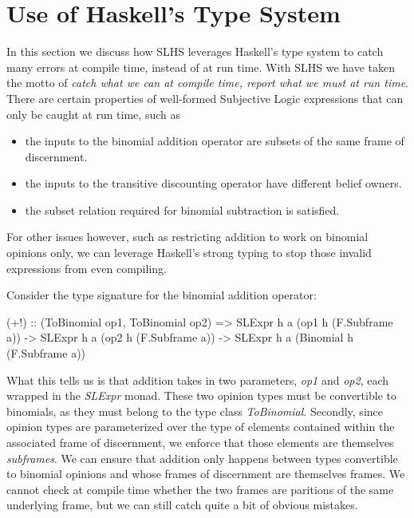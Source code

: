 \documentclass[thesis.tex]{subfiles}
\begin{document}
%
%





\section{Use of Haskell's Type System}
\label{sec:types}

In this section we discuss how SLHS leverages Haskell's type system to catch many errors
at compile time, instead of at run time. With SLHS we have taken the motto of \emph{catch what we
can at compile time, report what we must at run time}. There are certain properties of well-formed
Subjective Logic expressions that can only be caught at run time, such as

\begin{itemize}
  \item the inputs to the binomial addition operator are subsets of the same frame
    of discernment.
  \item the inputs to the transitive discounting operator have different belief
    owners.
  \item the subset relation required for binomial subtraction is satisfied.
\end{itemize}

For other issues however, such as restricting addition to work on binomial opinions only, we can
leverage Haskell's strong typing to stop those invalid expressions from even compiling.

Consider the type signature for the binomial addition operator:

\begin{spec}
(+!) :: (ToBinomial op1, ToBinomial op2)
       => SLExpr h a (op1 h (F.Subframe a))
       -> SLExpr h a (op2 h (F.Subframe a))
       -> SLExpr h a (Binomial h (F.Subframe a))
\end{spec}

What this tells us is that addition takes in two parameters, \emph{op1} and \emph{op2}, each wrapped in
the \emph{SLExpr} monad. These two opinion types must be convertible to binomials, as they must belong to
the type class \emph{ToBinomial}. Secondly, since opinion types are parameterized over the type of elements
contained within the associated frame of discernment, we enforce that those elements are themselves
\emph{subframes}. We can ensure that addition only happens between types convertible to binomial opinions
and whose frames of discernment are themselves frames. We cannot check at compile time whether the two
frames are paritions of the same underlying frame, but we can still catch quite a bit of obvious mistakes.
\end{document}
